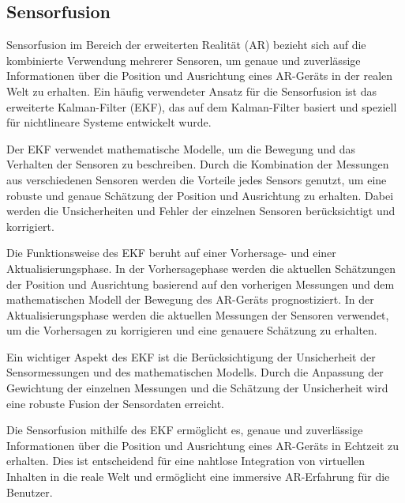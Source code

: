 \subsection{Sensorfusion}
Sensorfusion im Bereich der erweiterten Realität (AR) bezieht sich auf die
kombinierte Verwendung mehrerer Sensoren, um genaue und zuverlässige
Informationen über die Position und Ausrichtung eines AR-Geräts in der realen
Welt zu erhalten. Ein häufig verwendeter Ansatz für die Sensorfusion ist das
erweiterte Kalman-Filter (EKF), das auf dem Kalman-Filter basiert und speziell
für nichtlineare Systeme entwickelt wurde.

Der EKF verwendet mathematische Modelle, um die Bewegung und das Verhalten der
Sensoren zu beschreiben. Durch die Kombination der Messungen aus verschiedenen
Sensoren werden die Vorteile jedes Sensors genutzt, um eine robuste und genaue
Schätzung der Position und Ausrichtung zu erhalten. Dabei werden die
Unsicherheiten und Fehler der einzelnen Sensoren berücksichtigt und korrigiert.

Die Funktionsweise des EKF beruht auf einer Vorhersage- und einer
Aktualisierungsphase. In der Vorhersagephase werden die aktuellen Schätzungen
der Position und Ausrichtung basierend auf den vorherigen Messungen und dem
mathematischen Modell der Bewegung des AR-Geräts prognostiziert. In der
Aktualisierungsphase werden die aktuellen Messungen der Sensoren verwendet, um
die Vorhersagen zu korrigieren und eine genauere Schätzung zu erhalten.

Ein wichtiger Aspekt des EKF ist die Berücksichtigung der Unsicherheit der
Sensormessungen und des mathematischen Modells. Durch die Anpassung der
Gewichtung der einzelnen Messungen und die Schätzung der Unsicherheit wird eine
robuste Fusion der Sensordaten erreicht.

Die Sensorfusion mithilfe des EKF ermöglicht es, genaue und zuverlässige
Informationen über die Position und Ausrichtung eines AR-Geräts in Echtzeit zu
erhalten. Dies ist entscheidend für eine nahtlose Integration von virtuellen
Inhalten in die reale Welt und ermöglicht eine immersive AR-Erfahrung für die
Benutzer. \cite{5336489,simon2006optimal}



